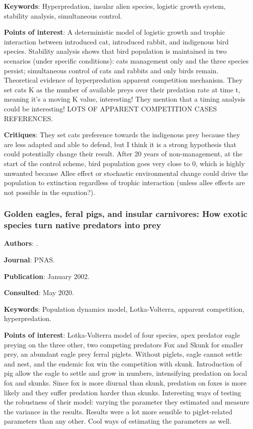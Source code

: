 \documentclass[12pt,a4paper]{article}
\begin{document}
\textbf{Keywords}: Hyperpredation, insular alien species, logistic growth system, stability analysis, simultaneous control.

\textbf{Points of interest}: A deterministic model of logistic growth and trophic interaction between introduced cat, introduced rabbit, and indigenous bird species. Stability analysis shows that bird population is maintained in two scenarios (under specific conditions): cats management only and the three species persist; simultaneous control of cats and rabbits and only birds remain. Theoretical evidence of hyperpredation apparent competition mechanism. They set cats K as the number of available preys over their predation rate at time t, meaning it's a moving K value, interesting! They mention that a timing analysis could be interesting!
LOTS OF APPARENT COMPETITION CASES REFERENCES.

\textbf{Critiques}: They set cats preference towards the indigenous prey because they are less adapted and able to defend, but I think it is a strong hypothesis that could potentially change their result. After 20 years of non-management, at the start of the control scheme, bird population goes very close to 0, which is highly unwanted because Allee effect or stochastic environmental change could drive the population to extinction regardless of trophic interaction (unless allee effects are not possible in the equation?).

\newpage

\subsubsection*{Golden eagles, feral pigs, and insular carnivores: How exotic species turn native predators into prey}

\textbf{Authors}: \cite{roemer2002eagle}.

\textbf{Journal}: PNAS.

\textbf{Publication}: January 2002.

\textbf{Consulted}: May 2020.

\textbf{Keywords}: Population dynamics model, Lotka-Volterra, apparent competition, hyperpredation.

\textbf{Points of interest}: Lotka-Volterra model of four species, apex predator eagle preying on the three other, two competing predators Fox and Skunk for smaller prey, an abundant eagle prey ferral piglets. Without piglets, eagle cannot settle and nest, and the endemic fox win the competition with skunk. Introduction of pig allow the eagle to settle and grow in numbers, intensifying predation on local fox and skunks. Since fox is more diurnal than skunk, predation on foxes is more likely and they suffer predation harder than skunks.
Interesting ways of testing the robustness of their model: varying the parameter they estimated and measure the variance in the results. Results were a lot more sensible to piglet-related parameters than any other. Cool ways of estimating the parameters as well.
\end{document}
